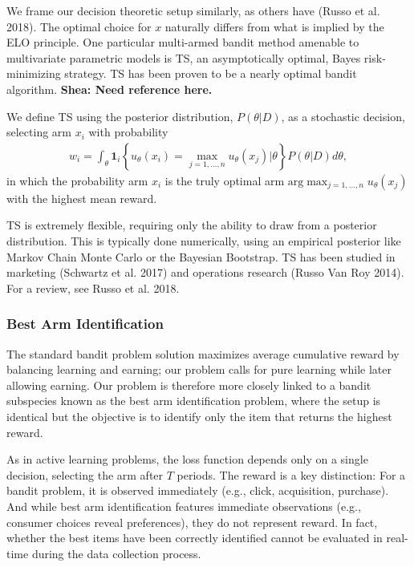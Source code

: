 \documentclass[a4paper,11pt]{article}
\begin{document}
We frame our decision theoretic setup similarly, as others have (Russo et al. 2018). The optimal choice for $x$ naturally differs from what is implied by the ELO principle. One particular multi-armed bandit method amenable to multivariate parametric models is TS, an asymptotically optimal, Bayes risk-minimizing strategy. TS has been proven to be a nearly optimal bandit algorithm. \textbf{Shea: Need reference here.} 

We define TS using the posterior distribution, $P(\theta|D)$, as a stochastic decision, selecting arm $x_i$ with probability
\begin{align} 
w_i = \int_\theta \mathbf{1}_i\left\{ u_\theta(x_i) = \max_{j=1,\ldots,n} u_\theta(x_j) | \theta \right\} P(\theta|D)d\theta ,
\end{align}
in which the probability arm $x_i$ is the truly optimal arm $\text{arg}\max_{j=1,\ldots,n} u_\theta(x_j)$ with the highest mean reward. 

TS is extremely flexible, requiring only the ability to draw from a posterior distribution. This is typically done numerically, using an empirical posterior like Markov Chain Monte Carlo or the Bayesian Bootstrap. TS has been studied in marketing (Schwartz et al. 2017) and operations research (Russo Van Roy 2014). For a review, see Russo et al. 2018. 

\subsubsection{Best Arm Identification}

The standard bandit problem solution maximizes average cumulative reward by balancing learning and earning; our problem calls for pure learning while later allowing earning. Our problem is therefore more closely linked to a bandit subspecies known as the best arm identification problem, where the setup is identical but the objective is to identify only the item that returns the highest reward. 

As in active learning problems, the loss function depends only on a single decision, selecting the arm after $T$ periods. The reward is a key distinction: For a bandit problem, it is observed immediately (e.g., click, acquisition, purchase). And while best arm identification features immediate observations (e.g., consumer choices reveal preferences), they do not represent reward. In fact, whether the best items have been correctly identified cannot be evaluated in real-time during the data collection process. 
\end{document}
